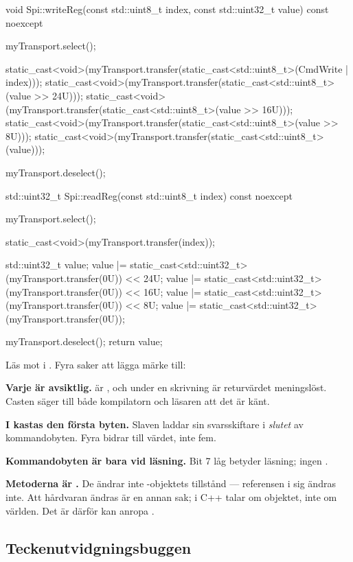 \begin{cppcode}
void Spi::writeReg(const std::uint8_t index, const std::uint32_t value) const noexcept
{
    myTransport.select();

    static_cast<void>(myTransport.transfer(static_cast<std::uint8_t>(CmdWrite | index)));
    static_cast<void>(myTransport.transfer(static_cast<std::uint8_t>(value >> 24U)));
    static_cast<void>(myTransport.transfer(static_cast<std::uint8_t>(value >> 16U)));
    static_cast<void>(myTransport.transfer(static_cast<std::uint8_t>(value >> 8U)));
    static_cast<void>(myTransport.transfer(static_cast<std::uint8_t>(value)));

    myTransport.deselect();
}

std::uint32_t Spi::readReg(const std::uint8_t index) const noexcept
{
    myTransport.select();

    static_cast<void>(myTransport.transfer(index));

    std::uint32_t value{};
    value |= static_cast<std::uint32_t>(myTransport.transfer(0U)) << 24U;
    value |= static_cast<std::uint32_t>(myTransport.transfer(0U)) << 16U;
    value |= static_cast<std::uint32_t>(myTransport.transfer(0U)) << 8U;
    value |= static_cast<std::uint32_t>(myTransport.transfer(0U));

    myTransport.deselect();
    return value;
}
\end{cppcode}

Läs  mot  i . Fyra saker att lägga märke till:

\textbf{Varje  är avsiktlig.}  är \code{[[nodiscard]]},
och under en skrivning är returvärdet meningslöst. Casten säger till både kompilatorn och läsaren
att det är känt.

\textbf{I  kastas den första byten.} Slaven laddar sin svarsskiftare i \emph{slutet}
av kommandobyten. Fyra  bidrar till värdet, inte fem.

\textbf{Kommandobyten är bara  vid läsning.} Bit 7 låg betyder läsning; ingen
.

\textbf{Metoderna är .} De ändrar inte -objektets tillstånd --- referensen i
sig ändras inte. Att hårdvaran ändras är en annan sak;  i C++ talar om objektet, inte
om världen. Det är därför  kan anropa .

\subsection{Teckenutvidgningsbuggen}

